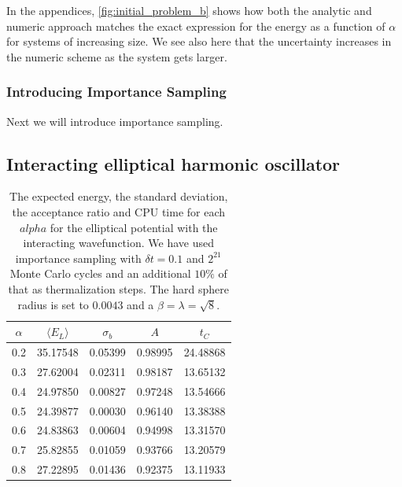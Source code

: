 \documentclass[
    a4paper, aps, twocolumn, floatfix, superscriptaddress, nofootinbib]{revtex4-1}
\newcommand{\1}{\mathds{1}}
\begin{document}
	In the appendices,  \autoref{fig:initial_problem_b} shows how both the analytic and numeric approach
	matches the exact expression for the energy as a function of $\alpha$ for systems of increasing size. 
	We see also here that the uncertainty increases in the numeric scheme as the system gets larger. 

	\subsubsection{Introducing Importance Sampling}
	
	Next we will introduce importance sampling.

\subsection{Interacting elliptical harmonic oscillator}
         \begin{table}
             \caption{The expected energy, the standard
             deviation, the acceptance ratio and CPU time for each $alpha$
             for the elliptical potential with the interacting wavefunction. We
             have used importance sampling with $\delta t = 0.1$ and $2^{21}$
             Monte Carlo cycles and an additional $10\%$ of that as
             thermalization steps. The hard sphere radius is set to $0.0043$ and
             a $\beta = \lambda = \sqrt{8}$.}
             \centering
             \begin{ruledtabular}
                 \begin{tabular}{ccccc}
                     $\alpha$ & $\langle  E_L\rangle$ & $\sigma_b$
                     &$A$&$t_C$ \\
                     \hline
                     0.2&35.17548&0.05399&0.98995&24.48868\\
                     0.3&27.62004&0.02311&0.98187&13.65132\\
                     0.4&24.97850&0.00827&0.97248&13.54666\\
                     0.5&24.39877&0.00030&0.96140&13.38388\\
                     0.6&24.83863&0.00604&0.94998&13.31570\\
                     0.7&25.82855&0.01059&0.93766&13.20579\\
                     0.8&27.22895&0.01436&0.92375&13.11933\\
                 \end{tabular}
             \end{ruledtabular}
             \label{tab:10_interacting}
         \end{table}
 
\end{document}
